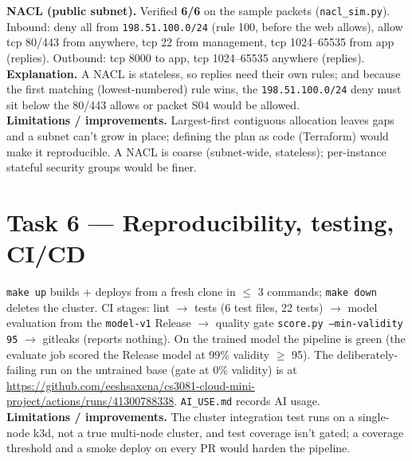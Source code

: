 \documentclass[10pt,a4paper]{article}
\newcommand{\code}[1]{\texttt{\small #1}}
\begin{document}
\noindent\textbf{NACL (public subnet).} Verified \textbf{6/6} on the sample packets (\code{nacl\_sim.py}).
Inbound: deny all from \code{198.51.100.0/24} (rule 100, before the web allows), allow tcp 80/443 from
anywhere, tcp 22 from management, tcp 1024--65535 from app (replies). Outbound: tcp 8000 to app, tcp
1024--65535 anywhere (replies). \textbf{Explanation.} A NACL is stateless, so replies need their own rules;
and because the first matching (lowest-numbered) rule wins, the \code{198.51.100.0/24} deny must sit below
the 80/443 allows or packet S04 would be allowed.\\
\textbf{Limitations / improvements.} Largest-first contiguous allocation leaves gaps and a subnet can't grow
in place; defining the plan as code (Terraform) would make it reproducible. A NACL is coarse (subnet-wide,
stateless); per-instance stateful security groups would be finer.

\section{Task 6 --- Reproducibility, testing, CI/CD}
\code{make up} builds + deploys from a fresh clone in $\leq$ 3 commands; \code{make down} deletes the
cluster. CI stages: lint $\rightarrow$ tests (6 test files, 22 tests) $\rightarrow$ model evaluation from the
\code{model-v1} Release $\rightarrow$ quality gate \code{score.py --min-validity 95} $\rightarrow$ gitleaks
(reports nothing). On the trained model the pipeline is green (the evaluate job scored the Release model at
99\% validity $\geq$ 95). The deliberately-failing run on the untrained base (gate at 0\% validity) is at
\url{https://github.com/eeshsaxena/cs3081-cloud-mini-project/actions/runs/41300788338}. \code{AI\_USE.md}
records AI usage.\\
\textbf{Limitations / improvements.} The cluster integration test runs on a single-node k3d, not a true
multi-node cluster, and test coverage isn't gated; a coverage threshold and a smoke deploy on every PR would
harden the pipeline.
\end{document}
